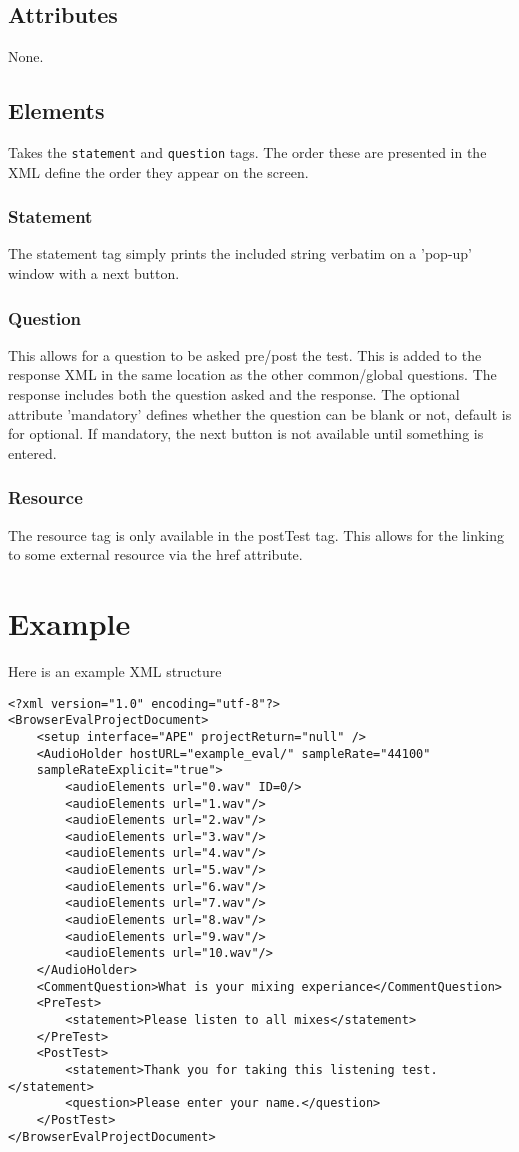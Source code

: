 \documentclass{article}
\begin{document}
\subsection{Attributes}
None.

\subsection{Elements}
Takes the \texttt{statement} and \texttt{question} tags. The order these are presented in the XML define the order they appear on the screen.

\subsubsection{Statement}

The statement tag simply prints the included string verbatim on a 'pop-up' window with a next button.

\subsubsection{Question}

This allows for a question to be asked pre/post the test. This is added to the response XML in the same location as the other common/global questions. The response includes both the question asked and the response. The optional attribute 'mandatory' defines whether the question can be blank or not, default is for optional. If mandatory, the next button is not available until something is entered.

\subsubsection{Resource}

The resource tag is only available in the postTest tag. This allows for the linking to some external resource via the href attribute.

\section{Example}

Here is an example XML structure

\begin{lstlisting}
<?xml version="1.0" encoding="utf-8"?>
<BrowserEvalProjectDocument>
	<setup interface="APE" projectReturn="null" />
	<AudioHolder hostURL="example_eval/" sampleRate="44100"
	sampleRateExplicit="true">
		<audioElements url="0.wav" ID=0/>
		<audioElements url="1.wav"/>
		<audioElements url="2.wav"/>
		<audioElements url="3.wav"/>
		<audioElements url="4.wav"/>
		<audioElements url="5.wav"/>
		<audioElements url="6.wav"/>
		<audioElements url="7.wav"/>
		<audioElements url="8.wav"/>
		<audioElements url="9.wav"/>
		<audioElements url="10.wav"/>
	</AudioHolder>
	<CommentQuestion>What is your mixing experiance</CommentQuestion>
	<PreTest>
		<statement>Please listen to all mixes</statement>
	</PreTest>
	<PostTest>
		<statement>Thank you for taking this listening test.</statement>
		<question>Please enter your name.</question>
	</PostTest>
</BrowserEvalProjectDocument>
\end{lstlisting}
\end{document}
